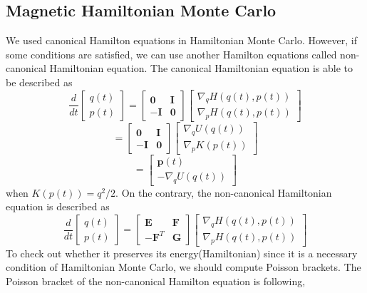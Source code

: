 \documentclass{article}
\begin{document}
\subsection{Magnetic Hamiltonian Monte Carlo}
We used canonical Hamilton equations in Hamiltonian Monte Carlo. However, if some conditions are satisfied, we can use another Hamilton equations called non-canonical Hamiltonian equation. The canonical Hamiltonian equation is able to be described as
\[
\frac{d}{dt}
\left[
\begin{array}{ccc}
q(t) \\
p(t)
\end{array}
\right]
=
\left[
\begin{array}{cclcc}
\textbf{0} & \textbf{I} \\
-\textbf{I} & \textbf{0}
\end{array}
\right]
\left[
\begin{array}{ccc}
\nabla_{q} H(q(t), p(t)) \\
\nabla_{p} H(q(t), p(t))
\end{array}
\right]
\]
\[
=
\left[
\begin{array}{cclcc}
\textbf{0} & \textbf{I} \\
-\textbf{I} & \textbf{0}
\end{array}
\right]
\left[
\begin{array}{ccc}
\nabla_{q} U(q(t)) \\
\nabla_{p} K(p(t))
\end{array}
\right]
\]
\[
=
\left[
\begin{array}{ccc}
\textbf{p}(t) \\
-\nabla_{q} U(q(t))
\end{array}
\right]
\]
when $K(p(t)) = q^2/2$. On the contrary, the non-canonical Hamiltonian equation is described as
\[
\frac{d}{dt}
\left[
\begin{array}{ccc}
q(t) \\
p(t)
\end{array}
\right]
=
\left[
\begin{array}{cclcc}
\textbf{E} & \textbf{F} \\
-\textbf{F}^{T} & \textbf{G}
\end{array}
\right]
\left[
\begin{array}{ccc}
\nabla_{q} H(q(t), p(t)) \\
\nabla_{p} H(q(t), p(t))
\end{array}
\right]
\]
To check out whether it preserves its energy(Hamiltonian) since it is a necessary condition of Hamiltonian Monte Carlo, we should compute Poisson brackets. The Poisson bracket of the non-canonical Hamilton equation is following,
\end{document}

